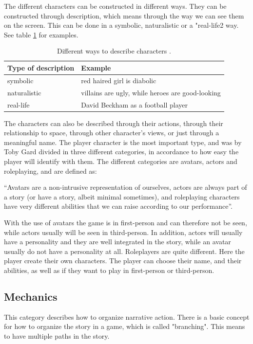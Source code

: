 The different characters can be constructed in different ways. They can be constructed through description, which means through the way we can see them on the screen. This can be done in a symbolic, naturalistic or a "real-life2 way. See table \ref{tab:description} for examples.

\begin{table}
\centering
    \begin{tabular}{|l|l|}
        \hline
        \textbf{Type of description} & \textbf{Example} \\ \hline
       symbolic & red haired girl is diabolic  \\ \hline
       naturalistic & villains are ugly, while heroes are good-looking \\ \hline
       real-life & David Beckham as a football player \\ \hline
    \end{tabular}
    \caption[Different ways to describe characters]{Different ways to describe characters \cite{understandingvg}.}
    \label{tab:description}
\end{table} 

The characters can also be described through their actions, through their relationship to space, through other character’s views, or just through a meaningful name. The player character is the most important type, and was by Toby Gard divided in three different categories, in accordance to how easy the player will identify with them. The different categories are avatars, actors and roleplaying, and are defined as:

“Avatars are a non-intrusive representation of ourselves, actors are always part of a story (or have a story, albeit minimal sometimes), and roleplaying characters have very different abilities that we can raise according to our performance”. \cite{understandingvg} 

With the use of avatars the game is in first-person and can therefore not be seen, while actors usually will be seen in third-person. In addition, actors will usually have a personality and they are well integrated in the story, while an avatar usually do not have a personality at all. Roleplayers are quite different. Here the player create their own characters. The player can choose their name, and their abilities, as well as if they want to play in first-person or third-person.  

\subsection{Mechanics}
This category describes how to organize narrative action. There is a basic concept for how to organize the story in a game, which is called "branching". This means to have multiple paths in the story. 

